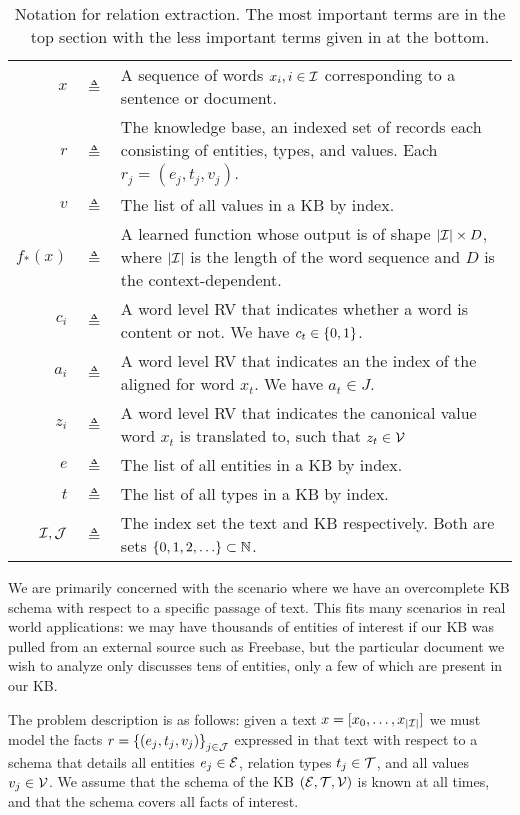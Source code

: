 \documentclass[12pt]{article}
\begin{document}
\begin{table}[htbp]\caption{Notation for relation extraction.
The most important terms are in the top section
with the less important terms given in at the bottom.}
\centering %
\begin{tabular}{r c p{10cm}}
\toprule
$x$ & $\triangleq$ & A sequence of words $x_i, i \in \mathcal{I}$
    corresponding to a sentence or document.\\
$r$ & $\triangleq$ & The knowledge base,
    an indexed set of records each consisting of entities, types, and values.
    Each $r_j = (e_j, t_j, v_j)$.\\
$v$ & $\triangleq$ & The list of all values in a KB by index.\\
$f_*(x)$ & $\triangleq$ & A learned function whose output is of shape $|\mathcal{I}| \times D$,
    where $|\mathcal{I}|$ is the length of the word sequence and $D$ is the context-dependent.\\
$c_i$ & $\triangleq$ & A word level RV that indicates whether a word is content or not.
    We have $c_t \in \left\{0,1\right\}$.\\
$a_i$ & $\triangleq$ & A word level RV that indicates an the index of the aligned
    for word $x_t$. We have $a_t \in J$.\\
$z_i$ & $\triangleq$ & A word level RV that indicates the canonical value 
word $x_t$ is translated to, such that $z_t \in \mathcal{V}$\\
\midrule
$e$ & $\triangleq$ & The list of all entities in a KB by index.\\
$t$ & $\triangleq$ & The list of all types in a KB by index.\\
$\mathcal{I},\mathcal{J}$ & $\triangleq$ & The index set the text and KB respectively.
    Both are sets $\left\{0,1,2,\ldots\right\}\subset \mathbb{N}$.\\
\bottomrule
\end{tabular}
\label{tab:TableOfNotationForMyResearch}
\end{table}

We are primarily concerned with the scenario where we have an overcomplete KB schema with
respect to a specific passage of text.
This fits many scenarios in real world applications:
we may have thousands of entities of interest if our KB was pulled from an 
external source such as Freebase,
but the particular document we wish to analyze only discusses tens of entities,
only a few of which are present in our KB.

The problem description is as follows:
given a text $x = [x_0, \ldots, x_{|\mathcal{I}|}]$ we must model the facts
$r = \left\{(e_j, t_j, v_j)\right\}_{j \in \mathcal{J}}$ expressed in that text
with respect to a schema that details all entities $e_j \in \mathcal{E}$,
relation types $t_j \in \mathcal{T}$, and all values $v_j \in \mathcal{V}$.
We assume that the schema of the KB $(\mathcal{E}, \mathcal{T}, \mathcal{V})$ is known at all times,
and that the schema covers all facts of interest.
\end{document}
